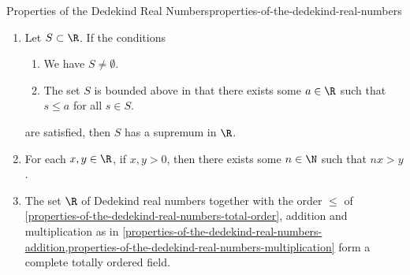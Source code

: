 \begin{proposition}{Properties of the Dedekind Real Numbers}{properties-of-the-dedekind-real-numbers}
\begin{enumerate}
\[\begin{aligned}
                        &\text{such that $r\less k$}%
                    \end{aligned}%
                \}.%
            \]%
        \item\label{properties-of-the-dedekind-real-numbers-the-dedekind-real-numbers-admit-suprema-of-bounded-subsets}Let $S\subset\R$. If the conditions
            \begin{enumerate}
                \item\label{properties-of-the-dedekind-real-numbers-the-dedekind-real-numbers-admit-suprema-of-bounded-subsets-1}We have $S\neq\emptyset$.
                \item\label{properties-of-the-dedekind-real-numbers-the-dedekind-real-numbers-admit-suprema-of-bounded-subsets-2}The set $S$ is bounded above in that there exists some $a\in\R$ such that $s\leq a$ for all $s\in S$.
            \end{enumerate}
            are satisfied, then $S$ has a supremum in $\R$.
        \item\label{properties-of-the-dedekind-real-numbers-the-archimedean-property}For each $x,y\in\R$, if $x,y\greater0$, then there exists some $n\in\N$ such that $nx\greater y$.
        \item\label{properties-of-the-dedekind-real-numbers-the-bourbaki-real-numbers-form-a-complete-totally-ordered-field}The set $\R$ of Dedekind real numbers together with the order $\leq$ of \cref{properties-of-the-dedekind-real-numbers-total-order}, addition and multiplication as in \cref{properties-of-the-dedekind-real-numbers-addition,properties-of-the-dedekind-real-numbers-multiplication} form a complete totally ordered field.
    \end{enumerate}
\end{proposition}
